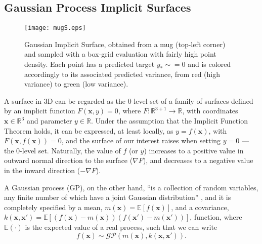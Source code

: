 
\subsection{Gaussian Process Implicit Surfaces}
\label{sec:gpis}
\begin{figure}[t]
    \centering
    \texttt{[image: mugS.eps]}
    \caption{Gaussian Implicit Surface, obtained from a mug (top-left corner) and sampled with a box-grid evaluation with fairly high point density. Each point has a predicted target $y_* \sim= 0$ and is colored accordingly to its associated
    predicted variance, from red (high variance) to green (low variance).}
    \label{fig:gpmug}
\end{figure}

A surface in 3D can be regarded as the $0$-level set of a family of surfaces defined by an implicit function $F(\mathbf{x}, y)=0$, where $F:\mathbb{R}^{3+1}\rightarrow \mathbb{R}$, with coordinates $\mathbf{x}\in \mathbb{R}^3$ and parameter $y\in \mathbb{R}$.
 Under the assumption that the Implicit Function Theorem holds, it can be expressed, at least locally, as $y = f(\mathbf{x})$, with $F(\mathbf{x},f(\mathbf{x}))=0$, and the surface of our interest raises when setting $y = 0$ --- the $0$-level set. Naturally, the value of $f$ (or $y$) increases to a positive value in outward normal direction to the surface ($\nabla F$), and decreases to a negative value in the inward direction ($-\nabla F$).

A Gaussian process (GP), on the other hand, ``is a collection of random variables, any finite number of which have a joint Gaussian distribution'' \citep[Def. 2.1]{Rasmussen2006Gaussian}, and it is completely specified by a mean, $m(\mathbf{x}) = \mathbb{E}[f(\mathbf{x})]$, and a covariance, $k(\mathbf{x},\mathbf{x}') = \mathbb{E}[(f(\mathbf{x}) - m(\mathbf{x}))(f(\mathbf{x}') - m(\mathbf{x}'))]$, function, where $\mathbb{E}(\cdot)$ is the expected value of a real process, such that we can write
\begin{equation}
f(\mathbf{x}) \sim \mathcal{GP}(m(\mathbf{x}), k(\mathbf{x},\mathbf{x}')).
\end{equation}

